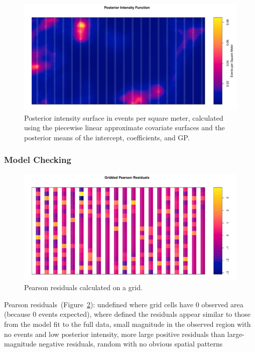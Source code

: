 \documentclass[]{interact}
\begin{document}
\begin{figure}[h]
\includegraphics[width=\textwidth]{figures/bei-effort_intensity.pdf}
\caption{Posterior intensity surface in events per square meter, calculated
using the piecewise linear approximate covariate surfaces and the posterior
means of the intercept, coefficients, and GP.}
\label{effortintensity}
\end{figure}


\subsubsection{Model Checking}

\begin{figure}[h]
\includegraphics[width=\textwidth]{figures/bei-effort_residuals.pdf}
\caption{Pearson residuals calculated on a grid.}
\label{effortresiduals}
\end{figure}

Pearson residuals~(Figure~\ref{effortresiduals}): undefined where grid cells
have 0 observed area (because 0 events expected), where defined the residuals
appear similar to those from the model fit to the full data, small magnitude
in the observed region with no events and low posterior intensity, more large
positive residuals than large-magnitude negative residuals, random with no
obvious spatial patterns
\end{document}
